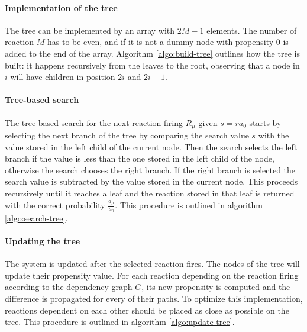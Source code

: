       \paragraph{Implementation of the tree}
      The tree can be implemented by an array with $2M-1$ elements.
      The number of reaction $M$ has to be even, and if it is not a dummy node with propensity $0$ is added to the end of the array.
      Algorithm \ref{algo:build-tree} outlines how the tree is built: it happens recursively from the leaves to the root, observing that a node in $i$ will have children in position $2i$ and $2i+1$.

      

      \paragraph{Tree-based search}
      The tree-based search for the next reaction firing $R_\mu$ given $s = ra_0$ starts by selecting the next branch of the tree by comparing the search value $s$ with the value stored in the left child of the current node.
      Then the search selects the left branch if the value is less than the one stored in the left child of the node, otherwise the search chooses the right branch.
      If the right branch is selected the search value is subtracted by the value stored in the current node.
      This proceeds recursively until it reaches a leaf and the reaction stored in that leaf is returned with the correct probability $\frac{a_\mu}{a_0}$.
      This procedure is outlined in algorithm \ref{algo:search-tree}.

      

      \paragraph{Updating the tree}
      The system is updated after the selected reaction fires.
      The nodes of the tree will update their propensity value.
      For each reaction depending on the reaction firing according to the dependency graph $G$, its new propensity is computed and the difference is propagated for every of their paths.
      To optimize this implementation, reactions dependent on each other should be placed as close as possible on the tree.
      This procedure is outlined in algorithm \ref{algo:update-tree}.

      

